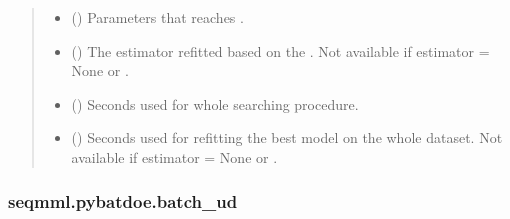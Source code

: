 \documentclass[letterpaper,10pt,english]{sphinxmanual}
\begin{document}
\begin{fulllineitems}
\begin{quote}
\begin{description}
\begin{itemize}
\item {} 
 () \textendash{} Parameters that reaches .

\item {} 
 () \textendash{} The estimator refitted based on the . 
Not available if estimator = None or .

\item {} 
 () \textendash{} Seconds used for whole searching procedure.

\item {} 
 () \textendash{} Seconds used for refitting the best model on the whole dataset.
Not available if estimator = None or .

\end{itemize}

\end{description}\end{quote}

\end{fulllineitems}



\subsubsection{seqmml.pybatdoe.batch\_ud}
\label{\detokenize{apidoc:module-pybatdoe.batch_ud}}\label{\detokenize{apidoc:seqmml-pybatdoe-batch-ud}}
\end{document}
